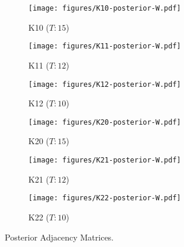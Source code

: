 \begin{figure}[h]
	\centering
	\begin{subfigure}{0.31\textwidth}
		\centering
		\texttt{[image: figures/K10-posterior-W.pdf]}
		\caption{K10 ($T: 15$)}
	\end{subfigure}
	\begin{subfigure}{0.31\textwidth}
		\centering
		\texttt{[image: figures/K11-posterior-W.pdf]}
		\caption{K11 ($T: 12$)}
	\end{subfigure}
	\begin{subfigure}{0.31\textwidth}
		\centering
		\texttt{[image: figures/K12-posterior-W.pdf]}
		\caption{K12 ($T: 10$)}
	\end{subfigure}
	\begin{subfigure}{0.31\textwidth}
		\centering
		\texttt{[image: figures/K20-posterior-W.pdf]}
		\caption{K20 ($T: 15$)}
	\end{subfigure}
	\begin{subfigure}{0.31\textwidth}
		\centering
		\texttt{[image: figures/K21-posterior-W.pdf]}
		\caption{K21 ($T: 12$)}
	\end{subfigure}
	\begin{subfigure}{0.31\textwidth}
		\centering
		\texttt{[image: figures/K22-posterior-W.pdf]}
		\caption{K22 ($T: 10$)}
	\end{subfigure}
	\caption{Posterior Adjacency Matrices.}
	\label{fig:K1}
\end{figure}
